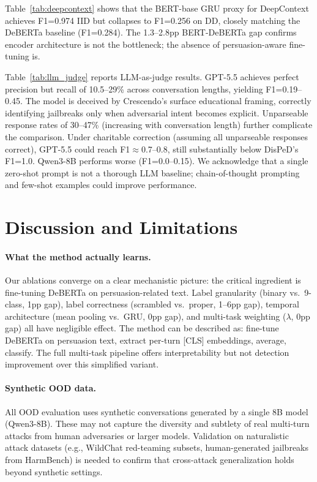 \documentclass[11pt,a4paper]{article}
\newcommand{\ours}{DisPeD}
\begin{document}
Table~\ref{tab:deepcontext} shows that the BERT-base GRU proxy for DeepContext achieves F1=0.974 IID but collapses to F1=0.256 on DD, closely matching the DeBERTa baseline (F1=0.284). The 1.3--2.8pp BERT-DeBERTa gap confirms encoder architecture is not the bottleneck; the absence of persuasion-aware fine-tuning is.

Table~\ref{tab:llm_judge} reports LLM-as-judge results. GPT-5.5 achieves perfect precision but recall of 10.5--29\% across conversation lengths, yielding F1=0.19--0.45. The model is deceived by Crescendo's surface educational framing, correctly identifying jailbreaks only when adversarial intent becomes explicit. Unparseable response rates of 30--47\% (increasing with conversation length) further complicate the comparison. Under charitable correction (assuming all unparseable responses correct), GPT-5.5 could reach F1$\approx$0.7--0.8, still substantially below \ours{}'s F1=1.0. Qwen3-8B performs worse (F1=0.0--0.15). We acknowledge that a single zero-shot prompt is not a thorough LLM baseline; chain-of-thought prompting and few-shot examples could improve performance.


\section{Discussion and Limitations}

\paragraph{What the method actually learns.}
Our ablations converge on a clear mechanistic picture: the critical ingredient is fine-tuning DeBERTa on persuasion-related text. Label granularity (binary vs.\ 9-class, 1pp gap), label correctness (scrambled vs.\ proper, 1--6pp gap), temporal architecture (mean pooling vs.\ GRU, 0pp gap), and multi-task weighting ($\lambda$, 0pp gap) all have negligible effect. The method can be described as: fine-tune DeBERTa on persuasion text, extract per-turn [CLS] embeddings, average, classify. The full multi-task pipeline offers interpretability but not detection improvement over this simplified variant.

\paragraph{Synthetic OOD data.}
All OOD evaluation uses synthetic conversations generated by a single 8B model (Qwen3-8B). These may not capture the diversity and subtlety of real multi-turn attacks from human adversaries or larger models. Validation on naturalistic attack datasets (e.g., WildChat red-teaming subsets, human-generated jailbreaks from HarmBench) is needed to confirm that cross-attack generalization holds beyond synthetic settings.
\end{document}
